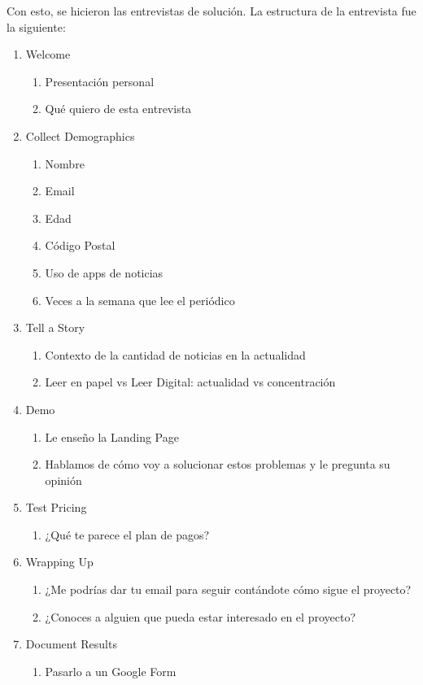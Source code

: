 Con esto, se hicieron las entrevistas de solución. La estructura de la entrevista fue la siguiente:
\begin{enumerate}
    \item Welcome
    \begin{enumerate}
        \item Presentación personal
        \item Qué quiero de esta entrevista
    \end{enumerate}
    \item Collect Demographics
    \begin{enumerate}
        \item Nombre
        \item Email
        \item Edad
        \item Código Postal
        \item Uso de apps de noticias
        \item Veces a la semana que lee el periódico
    \end{enumerate}
    \item Tell a Story
    \begin{enumerate}
        \item Contexto de la cantidad de noticias en la actualidad
        \item Leer en papel vs Leer Digital: actualidad vs concentración
    \end{enumerate}
    \item Demo
    \begin{enumerate}
        \item Le enseño la Landing Page
        \item Hablamos de cómo voy a solucionar estos problemas y le pregunta su opinión
    \end{enumerate}
    \item Test Pricing
    \begin{enumerate}
        \item ¿Qué te parece el plan de pagos?
    \end{enumerate}
    \item Wrapping Up
    \begin{enumerate}
        \item ¿Me podrías dar tu email para seguir contándote cómo sigue el proyecto?
        \item ¿Conoces a alguien que pueda estar interesado en el proyecto?
    \end{enumerate}
    \item Document Results
    \begin{enumerate}
        \item Pasarlo a un Google Form
    \end{enumerate}
\end{enumerate}

